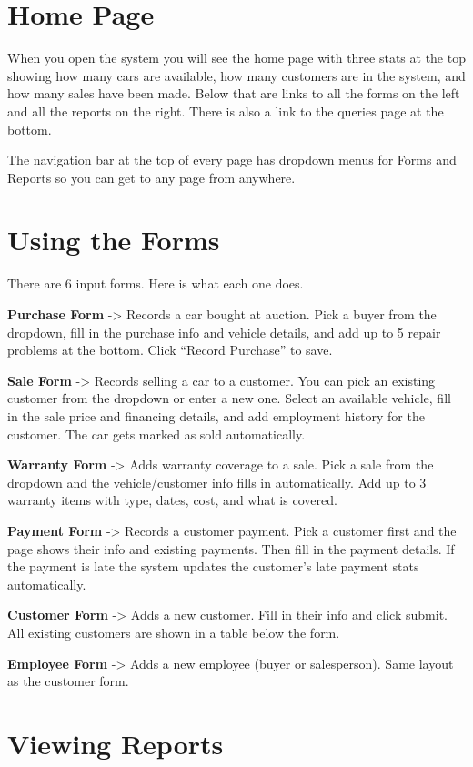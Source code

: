 \documentclass[12pt]{article}
\begin{document}
\section{Home Page}

When you open the system you will see the home page with three stats at the top showing how many cars are available, how many customers are in the system, and how many sales have been made. Below that are links to all the forms on the left and all the reports on the right. There is also a link to the queries page at the bottom.

The navigation bar at the top of every page has dropdown menus for Forms and Reports so you can get to any page from anywhere.

\section{Using the Forms}

There are 6 input forms. Here is what each one does.

\textbf{Purchase Form} -> Records a car bought at auction. Pick a buyer from the dropdown, fill in the purchase info and vehicle details, and add up to 5 repair problems at the bottom. Click ``Record Purchase'' to save.

\textbf{Sale Form} -> Records selling a car to a customer. You can pick an existing customer from the dropdown or enter a new one. Select an available vehicle, fill in the sale price and financing details, and add employment history for the customer. The car gets marked as sold automatically.

\textbf{Warranty Form} -> Adds warranty coverage to a sale. Pick a sale from the dropdown and the vehicle/customer info fills in automatically. Add up to 3 warranty items with type, dates, cost, and what is covered.

\textbf{Payment Form} -> Records a customer payment. Pick a customer first and the page shows their info and existing payments. Then fill in the payment details. If the payment is late the system updates the customer's late payment stats automatically.

\textbf{Customer Form} -> Adds a new customer. Fill in their info and click submit. All existing customers are shown in a table below the form.

\textbf{Employee Form} -> Adds a new employee (buyer or salesperson). Same layout as the customer form.

\section{Viewing Reports}
\end{document}
